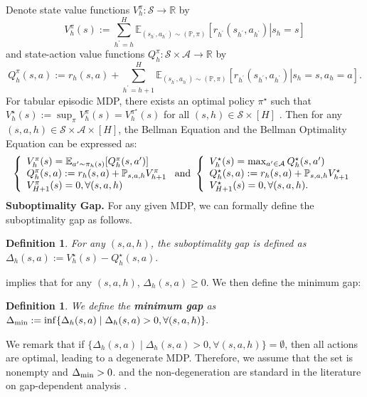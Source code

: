 \documentclass{article}
\newtheorem{definition}[theorem]{Definition}
\def\dmin{\Delta_{\textnormal{min}}}
\begin{document}
 Denote state value functions $V_h^\pi: \mathcal{S} \rightarrow \mathbb{R}$ by $$V_h^\pi(s):=\sum_{h^{\prime}=h}^H \mathbb{E}_{(s_{h^{\prime}},a_{h^{\prime}})\sim(\mathbb{P}, \pi)}\left[r_{h^{\prime}}(s_{h^{\prime}},a_{h^{\prime}}) \left. \right\vert s_h = s\right]$$
and state-action value functions $Q_h^\pi: \mathcal{S} \times \mathcal{A} \rightarrow \mathbb{R}$ by $$Q_h^\pi(s, a):=r_h(s,a)+\sum_{h^{\prime}=h+1}^H\mathbb{E}_{(s_{{h^\prime}},a_{h^\prime})\sim\left(\mathbb{P},\pi\right)}\left[ r_{h^{\prime}}(s_{h^{\prime}},a_{h^{\prime}}) \left. \right\vert s_h=s, a_h=a\right].$$ For tabular episodic MDP, there exists an optimal policy $\pi^{\star}$ such that $V_h^{\star}(s):=\sup _\pi V_h^\pi(s)=V_h^{\pi^{\star}}(s)$ for all $(s,h) \in \mathcal{S} \times [H]$  \citep{azar2017minimax}. Then for any $(s,a,h) \in \mathcal{S}\times\mathcal{A}\times [H]$, the Bellman Equation and the Bellman Optimality Equation can be expressed as:
	\begin{equation}\label{eq_Bellman}
		\left\{\begin{array} { l } 
			{ V _ { h } ^ { \pi } ( s ) = \mathbb{E}_{a'\sim \pi _ { h } ( s )}[Q _ { h } ^ { \pi } ( s , a' ) }] \\
			{ Q _ { h } ^ { \pi } ( s , a ) : =  r _ { h }(s,a) + \mathbb { P } _ { s,a,h } V _ { h + 1 } ^ { \pi } } \\
			{ V _ { H + 1 } ^ { \pi } ( s ) = 0,  \forall (s,a,h) }
		\end{array}  \textnormal { and } \left\{\begin{array}{l}
			V_h^{\star}(s)=\max _{a' \in \mathcal{A}} Q_h^{\star}(s, a') \\
			Q_h^{\star}(s, a):=r_h(s,a)+\mathbb{P}_{s,a,h} V_{h+1}^{\star}\\
			V_{H+1}^{\star}(s)=0,  \forall (s,a,h).
		\end{array}\right.\right.
	\end{equation}
\textbf{Suboptimality Gap.} For any given MDP, we can formally define the suboptimality gap as follows.
\begin{definition}\label{def_sub}
    For any $(s,a,h)$, the suboptimality gap is defined as
    $\Delta_h(s,a) := V_h^\star(s) - Q_h^\star(s,a).$
\end{definition}
 implies that for any $ (s,a,h)$, $\Delta_h(s,a) \geq 0$. We then define the minimum gap:
\begin{definition}\label{def_minsub}
    We define the \textbf{minimum gap} as $\dmin := \inf\{\Delta_h(s,a) \mid \Delta_h(s,a)>0, \forall (s,a,h)\}.$
\end{definition}
We remark that if $\{\Delta_h(s,a) \mid \Delta_h(s,a)>0,\forall (s,a,h)\} = \emptyset$, then all actions are optimal, leading to a degenerate MDP. Therefore, we assume that the set is nonempty and $\dmin > 0$.  and the non-degeneration are standard in the literature on gap-dependent analysis \cite{simchowitz2019non, xu2020reanalysis, yang2021q}.
\end{document}
